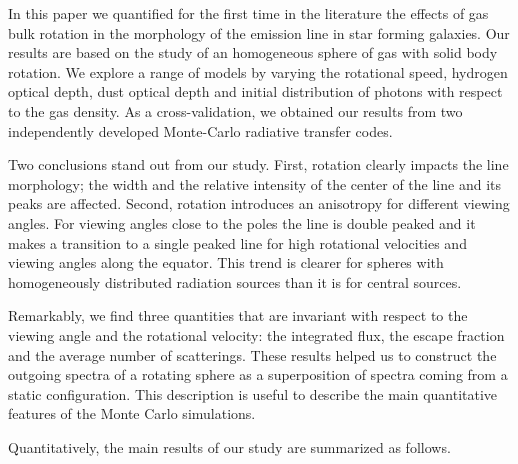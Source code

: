 \documentclass{emulateapj}
\newcommand{\ly}{{\ifmmode{{\rm Ly}\alpha~}\else{Ly$\alpha$~}\fi}}
\begin{document}
In this paper we quantified for the first time in the literature the effects
of gas bulk rotation in the morphology of the \ly emission line in
star forming galaxies.   
Our results are based on the study of an homogeneous sphere
of gas with solid body rotation. 
We explore a range of models by varying the rotational speed, hydrogen
optical depth, dust optical depth and initial distribution of \ly
photons with respect to the gas density. 
As a cross-validation, we obtained our results from two independently
developed Monte-Carlo radiative transfer codes.  

Two conclusions stand out from our study. 
First, rotation clearly impacts the \ly line morphology; the width and
the relative intensity of the center of the line and its peaks are
affected. 
Second, rotation introduces an anisotropy for different viewing
angles. 
For viewing angles close to the poles the line is double peaked and it
makes a transition to a single peaked line for high rotational
velocities and viewing angles along the equator. 
This trend is clearer for spheres with homogeneously distributed
radiation sources than it is for central sources.

Remarkably, we find three quantities that are invariant with respect
to the viewing angle and the rotational velocity: the integrated flux,
the escape fraction and the average number of scatterings.
These results helped us to construct the outgoing spectra of a
rotating sphere as a superposition of spectra coming from a static
configuration. This description is useful to describe the main
quantitative features of the Monte Carlo simulations. 


Quantitatively, the main results of our study are summarized as
follows. 
\end{document}
